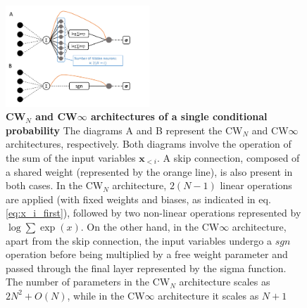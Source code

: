 \documentclass[aps,physrev,10pt,floatfix,reprint]{revtex4-2}
\begin{document}
\begin{figure}[!h]
    \centering 
    \includegraphics[width=0.48\textwidth]{img/CW_arch.pdf}
    \caption{\textbf{CW$_N$ and CW$\infty$ architectures of a single conditional probability} The diagrams A and B represent the CW$_N$ and CW$\infty$ architectures, respectively. Both diagrams involve the operation of the sum of the input variables $\mathbf{x}_{<i}$. A skip connection, composed of a shared weight (represented by the orange line), is also present in both cases. In the CW$_N$ architecture, $2(N-1)$ linear operations are applied (with fixed weights and biases, as indicated in eq.\ref{eq:x_i_first}), followed by two non-linear operations represented by $\log \sum \exp(x)$. On the other hand, in the CW$\infty$ architecture, apart from the skip connection, the input variables undergo a $sgn$ operation before being multiplied by a free weight parameter and passed through the final layer represented by the sigma function. The number of parameters in the CW$_N$ architecture scales as $2N^2+O(N)$, while in the CW$\infty$ architecture it scales as $N+1$}
    \label{fig:CW_arch}
\end{figure}
\end{document}
